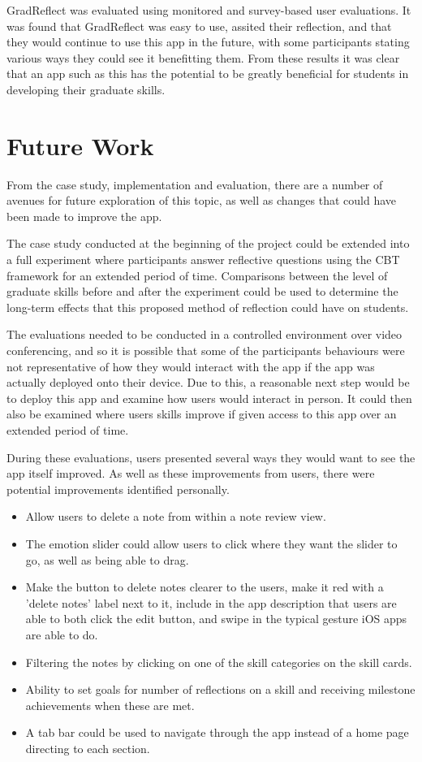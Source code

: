 \documentclass{l4proj}
\begin{document}
GradReflect was evaluated using monitored and survey-based user evaluations. It was found that GradReflect was easy to use, assited their reflection, and that they would continue to use this app in the future, with some participants stating various ways they could see it benefitting them. From these results it was clear that an app such as this has the potential to be greatly beneficial for students in developing their graduate skills.


\section{Future Work} \label{Concl_futureWork}

From the case study, implementation and evaluation, there are a number of avenues for future exploration of this topic, as well as changes that could have been made to improve the app. 

The case study conducted at the beginning of the project could be extended into a full experiment where participants answer reflective questions using the CBT framework for an extended period of time. Comparisons between the level of graduate skills before and after the experiment could be used to determine the long-term effects that this proposed method of reflection could have on students. 

The evaluations needed to be conducted in a controlled environment over video conferencing, and so it is possible that some of the participants behaviours were not representative of how they would interact with the app if the app was actually deployed onto their device. Due to this, a reasonable next step would be to deploy this app and examine how users would interact in person. It could then also be examined where users skills improve if given access to this app over an extended period of time.

During these evaluations, users presented several ways they would want to see the app itself improved. As well as these improvements from users, there were potential improvements identified personally.

\begin{itemize}
    \item Allow users to delete a note from within a note review view.
    \item The emotion slider could allow users to click where they want the slider to go, as well as being able to drag.
    \item Make the button to delete notes clearer to the users, make it red with a 'delete notes' label next to it, include in the app description that users are able to both click the edit button, and swipe in the typical gesture iOS apps are able to do.
    \item Filtering the notes by clicking on one of the skill categories on the skill cards.
    \item Ability to set goals for number of reflections on a skill and receiving milestone achievements when these are met.
    \item A tab bar could be used to navigate through the app instead of a home page directing to each section.
\end{itemize}
\end{document}
